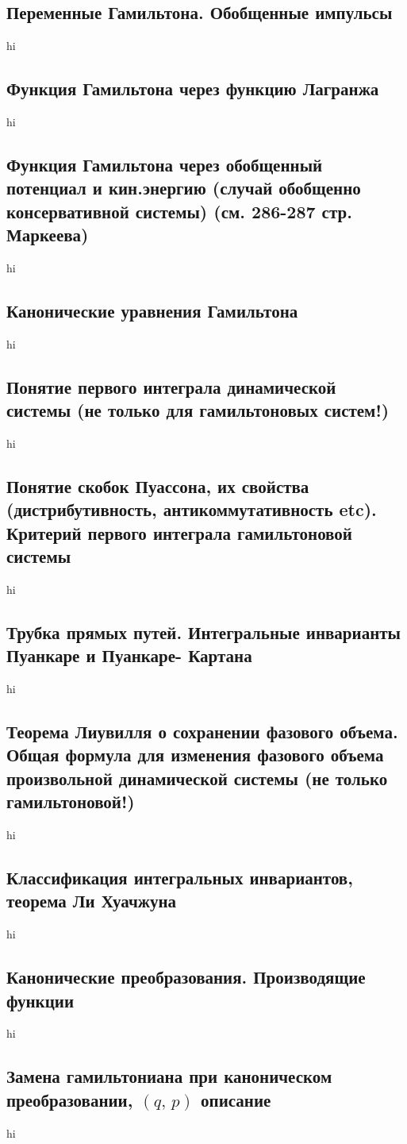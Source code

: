 \documentclass[a4paper,12pt]{article}
\begin{document}
\subsection{Переменные Гамильтона. Обобщенные импульсы}
hi
\subsection{Функция Гамильтона через функцию Лагранжа}
hi
\subsection{Функция Гамильтона через обобщенный потенциал и кин.энергию (случай
обобщенно консервативной системы) (см. 286-287 стр. Маркеева)}
hi
\subsection{Канонические уравнения Гамильтона}
hi
\subsection{Понятие первого интеграла динамической системы (не только для
гамильтоновых систем!)}
hi
\subsection{Понятие скобок Пуассона, их свойства (дистрибутивность,
антикоммутативность etc). Критерий первого интеграла гамильтоновой
системы}
hi
\subsection{Трубка прямых путей. Интегральные инварианты Пуанкаре и Пуанкаре-
Картана}
hi
\subsection{Теорема Лиувилля о сохранении фазового объема. Общая формула для
изменения фазового объема произвольной динамической системы (не только
гамильтоновой!)}
hi
\subsection{Классификация интегральных инвариантов, теорема Ли Хуачжуна}
hi
\subsection{Канонические преобразования. Производящие функции}
hi
\subsection{Замена гамильтониана при каноническом преобразовании, $(q,\,p)$ 
описание}
hi
\end{document}
